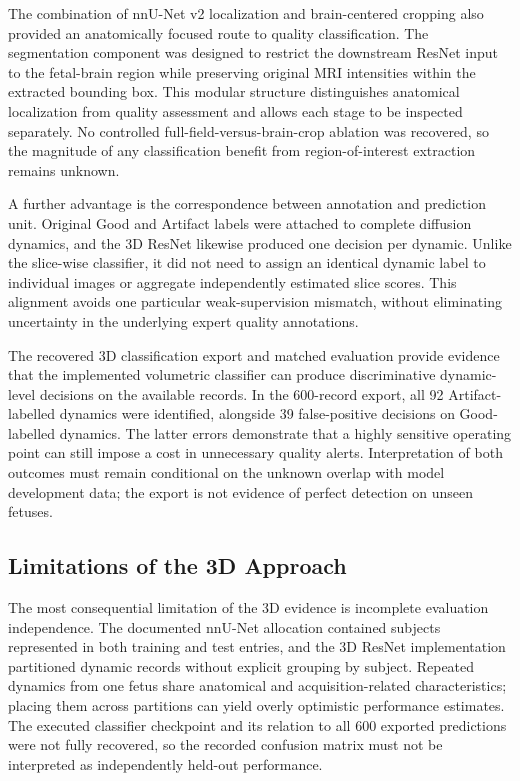 The combination of nnU-Net v2 localization and brain-centered cropping also provided an anatomically focused route to quality classification. The segmentation component was designed to restrict the downstream ResNet input to the fetal-brain region while preserving original MRI intensities within the extracted bounding box. This modular structure distinguishes anatomical localization from quality assessment and allows each stage to be inspected separately. No controlled full-field-versus-brain-crop ablation was recovered, so the magnitude of any classification benefit from region-of-interest extraction remains unknown.

A further advantage is the correspondence between annotation and prediction unit. Original Good and Artifact labels were attached to complete diffusion dynamics, and the 3D ResNet likewise produced one decision per dynamic. Unlike the slice-wise classifier, it did not need to assign an identical dynamic label to individual images or aggregate independently estimated slice scores. This alignment avoids one particular weak-supervision mismatch, without eliminating uncertainty in the underlying expert quality annotations.

The recovered 3D classification export and matched evaluation provide evidence that the implemented volumetric classifier can produce discriminative dynamic-level decisions on the available records. In the 600-record export, all 92 Artifact-labelled dynamics were identified, alongside 39 false-positive decisions on Good-labelled dynamics. The latter errors demonstrate that a highly sensitive operating point can still impose a cost in unnecessary quality alerts. Interpretation of both outcomes must remain conditional on the unknown overlap with model development data; the export is not evidence of perfect detection on unseen fetuses.

\subsection{Limitations of the 3D Approach}
\label{subsec:discussion_3d_limitations}

The most consequential limitation of the 3D evidence is incomplete evaluation independence. The documented nnU-Net allocation contained subjects represented in both training and test entries, and the 3D ResNet implementation partitioned dynamic records without explicit grouping by subject. Repeated dynamics from one fetus share anatomical and acquisition-related characteristics; placing them across partitions can yield overly optimistic performance estimates. The executed classifier checkpoint and its relation to all 600 exported predictions were not fully recovered, so the recorded confusion matrix must not be interpreted as independently held-out performance.


